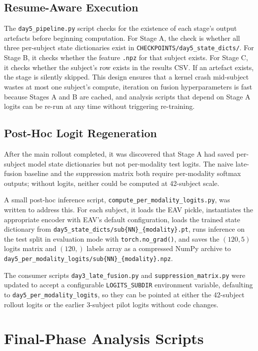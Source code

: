 \subsection{Resume-Aware Execution}
The \texttt{day5\_pipeline.py} script checks for the existence of each stage's output artefacts before beginning computation. For Stage A, the check is whether all three per-subject state dictionaries exist in \texttt{CHECKPOINTS/day5\_state\_dicts/}. For Stage B, it checks whether the feature \texttt{.npz} for that subject exists. For Stage C, it checks whether the subject's row exists in the results CSV. If an artefact exists, the stage is silently skipped. This design ensures that a kernel crash mid-subject wastes at most one subject's compute, iteration on fusion hyperparameters is fast because Stages A and B are cached, and analysis scripts that depend on Stage A logits can be re-run at any time without triggering re-training.

\subsection{Post-Hoc Logit Regeneration}
After the main rollout completed, it was discovered that Stage A had saved per-subject model state dictionaries but not per-modality test logits. The naive late-fusion baseline and the suppression matrix both require per-modality softmax outputs; without logits, neither could be computed at 42-subject scale.

A small post-hoc inference script, \texttt{compute\_per\_modality\_logits.py}, was written to address this. For each subject, it loads the EAV pickle, instantiates the appropriate encoder with EAV's default configuration, loads the trained state dictionary from \texttt{day5\_state\_dicts/sub\{NN\}\_\{modality\}.pt}, runs inference on the test split in evaluation mode with \texttt{torch.no\_grad()}, and saves the $(120,5)$ logits matrix and $(120,)$ labels array as a compressed NumPy archive to \texttt{day5\_per\_modality\_logits/sub\{NN\}\_\{modality\}.npz}.

The consumer scripts \texttt{day3\_late\_fusion.py} and \texttt{suppression\_matrix.py} were updated to accept a configurable \texttt{LOGITS\_SUBDIR} environment variable, defaulting to \texttt{day5\_per\_modality\_logits}, so they can be pointed at either the 42-subject rollout logits or the earlier 3-subject pilot logits without code changes.

\section{Final-Phase Analysis Scripts}
\label{sec:p3_scripts}

